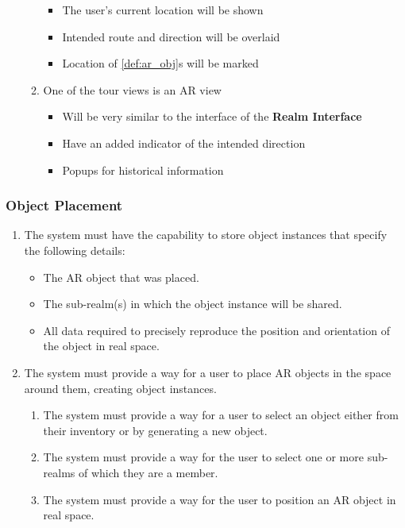 \documentclass{article}
\begin{document}
\begin{enumerate}[align=left, label=\textbf{TR-FR\arabic*:}]
\begin{enumerate}[align=left, label=\textbf{TR-FR4.\arabic*:}]
\begin{itemize}
            \item The user’s current location will be shown
            \item Intended route and direction will be overlaid
            \item Location of \ref{def:ar_obj}s will be marked
        \end{itemize}
        \item One of the tour views is an AR view
        \begin{itemize}
            \item Will be very similar to the interface of the \textbf{Realm Interface}
            \item Have an added indicator of the intended direction
            \item Popups for historical information
        \end{itemize}
    \end{enumerate}
\end{enumerate}

\subsubsection{Object Placement}
\label{ssub:object_placement}

\begin{enumerate}[align=left, label=\textbf{OP-FR\arabic*:}]
    \item The system must have the capability to store object instances that specify the following details:
    \begin{itemize}
        \item The AR object that was placed.
        \item The sub-realm(s) in which the object instance will be shared.
        \item All data required to precisely reproduce the position and orientation of the object in real space.
    \end{itemize}
    
    \item The system must provide a way for a user to place AR objects in the space around them, creating object instances.
    \begin{enumerate}[align=left, label=\textbf{OP-FR2.\arabic*:}]
        \item The system must provide a way for a user to select an object either from their inventory or by generating a new object.
        \item The system must provide a way for the user to select one or more sub-realms of which they are a member.
        \item The system must provide a way for the user to position an AR object in real space.
    \end{enumerate}
\end{enumerate}
\end{document}
